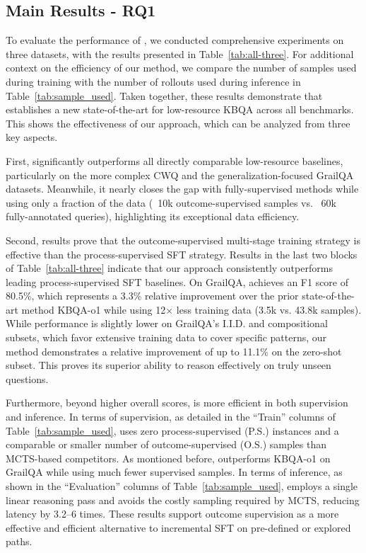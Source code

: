\subsection{Main Results - RQ1}
To evaluate the performance of \ours, we conducted comprehensive experiments on three datasets, with the results presented in Table~\ref{tab:all-three}. For additional context on the efficiency of our method, we compare the number of samples used during training with the number of rollouts used during inference in Table~\ref{tab:sample_used}. Taken together, these results demonstrate that \ours establishes a new state-of-the-art for low-resource KBQA across all benchmarks. This shows the effectiveness of our approach, which can be analyzed from three key aspects.

First, \ours \space significantly outperforms all directly comparable low-resource baselines, particularly on the more complex CWQ and the generalization-focused GrailQA datasets. Meanwhile, it nearly closes the gap with fully-supervised methods while using only a fraction of the data (~10k outcome-supervised samples vs. ~60k fully-annotated queries), highlighting its exceptional data efficiency. 


Second, results prove that the outcome-supervised multi-stage training strategy is effective than the process-supervised SFT strategy.
Results in the last two blocks of Table~\ref{tab:all-three} indicate that \ours \space our approach consistently outperforms leading process-supervised SFT baselines. On GrailQA, \ours \space achieves an F1 score of 80.5\%, which represents a 3.3\% relative improvement over the prior state-of-the-art method KBQA-o1 while using 12× less training data (3.5k vs. 43.8k samples). While performance is slightly lower on GrailQA's I.I.D. and compositional subsets, which favor extensive training data to cover specific patterns, our method demonstrates a relative improvement of up to 11.1\% on the zero-shot subset. This proves its superior ability to reason effectively on truly unseen questions.

Furthermore, beyond higher overall scores, \ours \space is more efficient in both supervision and inference. In terms of supervision, as detailed in the ``Train'' columns of Table~\ref{tab:sample_used}, \ours \space uses zero process-supervised (P.S.) instances and a comparable or smaller number of outcome-supervised (O.S.) samples than MCTS-based competitors. As montioned before, \ours \space outperforms KBQA-o1 on GrailQA while using much fewer supervised samples. In terms of inference, as shown in the ``Evaluation'' columns of Table~\ref{tab:sample_used}, \ours \space employs a single linear reasoning pass and avoids the costly sampling required by MCTS, reducing latency by 3.2–6 times.
These results support outcome supervision as a more effective and efficient alternative to incremental SFT on pre-defined or explored paths. 

